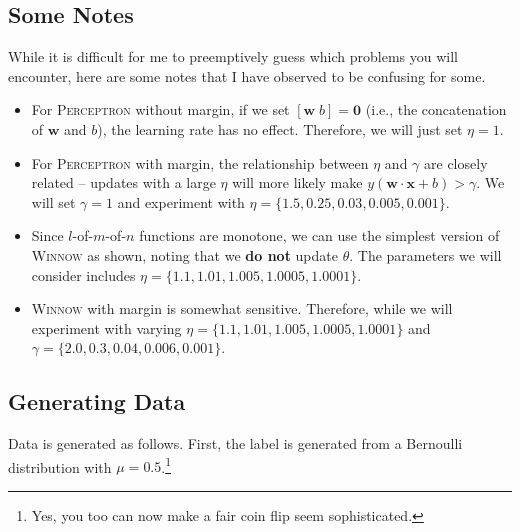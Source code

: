 \documentclass[12pt,letterpaper]{article}
\begin{document}
\begin{enumerate}
\subsection*{Some Notes}
While it is difficult for me to preemptively guess which problems you will encounter, here are some notes that I have observed to be confusing for some.
%
\begin{itemize}
\item
For \textsc{Perceptron} without margin, if we set $[\mathbf{w} \; b] = \mathbf{0}$ (i.e., the concatenation of $\mathbf{w}$ and $b$), the learning rate has no effect.  Therefore, we will just set $\eta = 1$.
\item
For \textsc{Perceptron} with margin, the relationship between $\eta$ and $\gamma$ are closely related -- updates with a large $\eta$ will more likely make $y (\mathbf{w} \cdot \mathbf{x} + b) > \gamma$.  We will set $\gamma = 1$ and experiment with $\eta = \{1.5, 0.25, 0.03, 0.005, 0.001\}$.
\item
Since $l$-of-$m$-of-$n$ functions are monotone, we can use the simplest version of \textsc{Winnow} as shown, noting that we {\bf do not} update $\theta$.  The parameters we will consider includes $\eta = \{1.1, 1.01, 1.005, 1.0005, 1.0001\}$.
\item
\textsc{Winnow} with margin is somewhat sensitive.  Therefore, while we will experiment with varying $\eta = \{1.1, 1.01, 1.005, 1.0005, 1.0001\}$ and $\gamma = \{2.0, 0.3, 0.04, 0.006, 0.001\}$.
\end{itemize}

\clearpage
\subsection*{Generating Data}

Data is generated as follows.  First, the label is generated from a Bernoulli distribution with $\mu=0.5$.\footnote{Yes, you too can now make a fair coin flip seem sophisticated.}


\end{enumerate}
\end{document}
